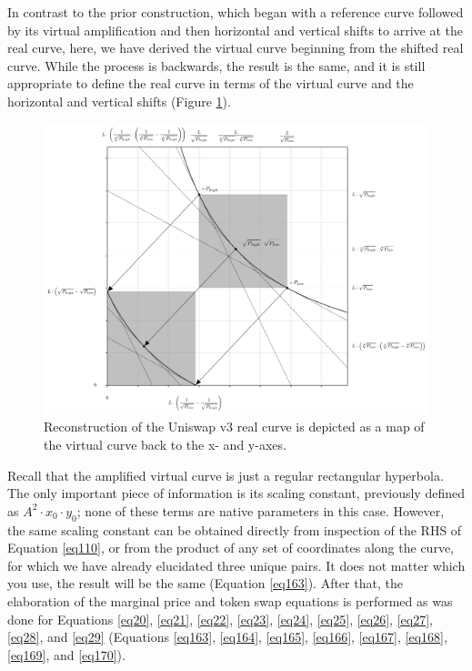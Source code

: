 \documentclass{article}
\begin{document}
In contrast to the prior construction, which began with a reference curve followed by its virtual amplification and then horizontal and vertical shifts to arrive at the real curve, here, we have derived the virtual curve beginning from the shifted real curve. While the process is backwards, the result is the same, and it is still appropriate to define the real curve in terms of the virtual curve and the horizontal and vertical shifts (Figure \ref{fig29}). 

\begin{figure}[ht]
    \centering
    \includegraphics[width=\textwidth]{fig29.png}
    \captionsetup{
        justification=raggedright,
        singlelinecheck=false,
        font=small,
        labelfont=bf,
        labelsep=quad,
        format=plain
    }
    \caption{Reconstruction of the Uniswap v3 real curve is depicted as a map of the virtual curve back to the x- and y-axes.}
    \label{fig29}
\end{figure}

Recall that the amplified virtual curve is just a regular rectangular hyperbola. The only important piece of information is its scaling constant, previously defined as $A^{2} \cdot x_{0} \cdot y_{0}$; none of these terms are native parameters in this case. However, the same scaling constant can be obtained directly from inspection of the RHS of Equation \ref{eq110}, or from the product of any set of coordinates along the curve, for which we have already elucidated three unique pairs. It does not matter which you use, the result will be the same (Equation \ref{eq163}). After that, the elaboration of the marginal price and token swap equations is performed as was done for Equations \ref{eq20}, \ref{eq21}, \ref{eq22}, \ref{eq23}, \ref{eq24}, \ref{eq25}, \ref{eq26}, \ref{eq27}, \ref{eq28}, and \ref{eq29} (Equations \ref{eq163}, \ref{eq164}, \ref{eq165}, \ref{eq166}, \ref{eq167}, \ref{eq168}, \ref{eq169}, and \ref{eq170}).
\end{document}
